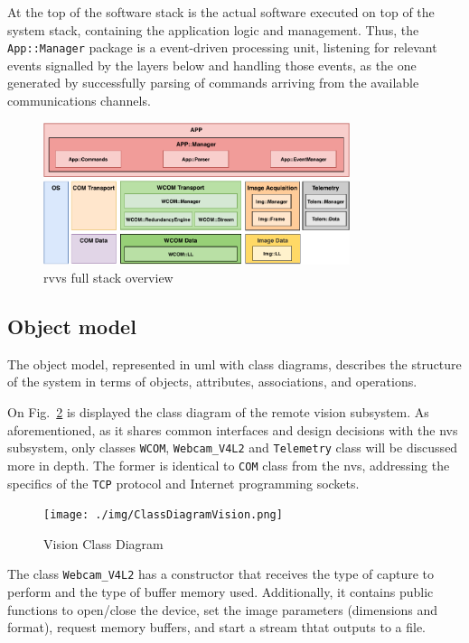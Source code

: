 At the top of the software stack is the actual software executed on top of the
system stack, containing the application logic and management. Thus, the
\texttt{App::Manager} package is a event-driven processing unit, listening for
relevant events signalled by the layers below and handling those events, as the
one generated by successfully parsing of commands arriving from the available
communications channels. 
\begin{figure}[!hbt]
\centering
    \includegraphics[width=0.8\textwidth]{./img/rvvs-full-stack.pdf}
  \caption{\acrshort{rvvs} full stack overview}%
\label{fig:rvvs-full-stack}
\end{figure}
%
\subsection{Object model}%
\label{sec:object-model-rvvs}
The object model, represented in \gls{uml} with class diagrams, describes the
structure of the system in terms of objects, attributes, associations, and
operations.

On Fig.~\ref{fig:vision-class-diag} is displayed the class diagram of the remote
vision subsystem. As aforementioned, as it shares common interfaces and design
decisions with the \gls{nvs} subsystem, only classes \texttt{WCOM},
\texttt{Webcam\_V4L2} and \texttt{Telemetry} class will be discussed more in
depth.  The former is identical to \texttt{COM} class from the \gls{nvs},
addressing the specifics of the \texttt{TCP} protocol and Internet programming
sockets.
%
\begin{figure}[!hbt]
\centering
    \texttt{[image: ./img/ClassDiagramVision.png]}
  \caption{Vision Class Diagram}%
\label{fig:vision-class-diag}
\end{figure}
%

The class \texttt{Webcam\_V4L2} has a constructor that receives the type of
capture to perform and the type of buffer memory used. Additionally, it contains
public functions to open/close the device, set the image parameters (dimensions
and format), request memory buffers, and start a stream thtat outputs to a file.

